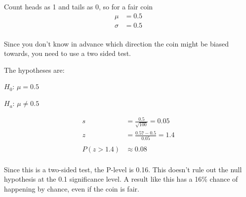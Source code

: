 \documentclass[landscape]{exam}
\begin{document}
\begin{questions}
     Count heads as 1 and tails as 0, so for a fair coin
     \begin{align*}
       \mu    & = 0.5 \\
       \sigma & = 0.5 \\
     \end{align*}

      \begin{solution}
        Since you don't know in advance which direction the coin might be
        biased towards, you need to use a two sided test.

        The hypotheses are:
        \begin{itemize*}
          \item $H_0$: $\mu = 0.5$
          \item $H_a$: $\mu \ne 0.5$
        \end{itemize*}

        \begin{align*}
          s & = \frac{0.5}{\sqrt{100}} = 0.05 \\
          z & = \frac{0.57 - 0.5}{0.05} = 1.4 \\
          \\
          P(z > 1.4) & \approx 0.08 \\
        \end{align*}

        Since this is a two-sided test, the P-level is 0.16. This doesn't
        rule out the null hypothesis at the 0.1 significance level. A result
        like this has a 16\% chance of happening by chance, even if the coin is
        fair.

      \end{solution}




\end{questions}
\end{document}
